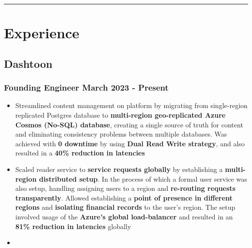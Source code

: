 \documentclass[12pt]{article}
\newcommand{\spacedhrule}[1]{
    \vspace{1ex}
    \hrule
    \vspace{#1}
}
\newcommand{\experienceItem}{\item [-] \small}
\newcommand{\spacedSubSubSection}[2]{\subsubsection {{#1} \hspace*{\fill} {#2}}}
\begin{document}
    \vspace{-0.5ex}
    \spacedhrule{2ex}

    \section{Experience}
    {
        \subsection{Dashtoon}
        {
        \spacedSubSubSection{Founding Engineer}{March 2023 - Present}
            {
                \begin{itemize}[itemsep=0.1ex, leftmargin=6ex, rightmargin=1ex]
                    \experienceItem
                    {
                        Streamlined content management on platform by migrating from single-region replicated Postgres
                        database to \textbf {multi-region geo-replicated Azure Cosmos (No-SQL) database}, \mbox {creating} a
                        single source of truth for content and eliminating consistency problems between multiple databases.
                        Was achieved with \textbf {0 downtime} by using \textbf {Dual Read Write strategy}, and also
                        \mbox {resulted} in a \textbf {40\% reduction in latencies}
                    }
                    \experienceItem
                    {
                        Scaled reader service to \textbf {service requests globally} by establishing a
                        \textbf {multi-region distributed setup}. In the process of which a formal user service was
                        also setup, handling assigning users to a region and \textbf {re-routing requests transparently}.
                        Allowed establishing a \textbf {point of presence in different regions} and
                        \textbf {isolating financial records} to the user's region. The setup involved usage of the
                        \textbf {Azure's global load-balancer} and resulted in an \textbf {81\% reduction in latencies}
                        \mbox{globally}
                    }
                    \experienceItem
                \end{itemize}
            }
        }
    }
\end{document}
